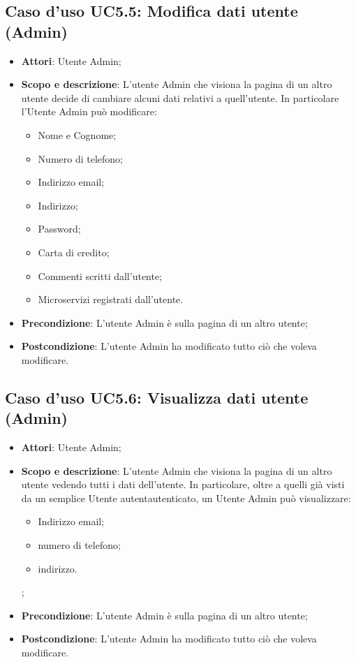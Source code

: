 \documentclass[12pt,a4paper,titlepage]{article}
\begin{document}
	\subsection{Caso d'uso UC5.5: Modifica dati utente (Admin)}
	\label{UC5.5}
	\begin{itemize}
		\item \textbf{Attori}: Utente Admin;
		\item \textbf{Scopo e descrizione}: L'utente Admin che visiona la pagina di un altro utente decide di cambiare alcuni dati relativi a quell'utente. In particolare l'Utente Admin può modificare:
		\begin{itemize}
			\item Nome e Cognome;
			\item Numero di telefono;
			\item Indirizzo email;
			\item Indirizzo;
			\item Password;
			\item Carta di credito;
			\item Commenti scritti dall'utente;
			\item Microservizi registrati dall'utente.
		\end{itemize}
		\item \textbf{Precondizione}: L'utente Admin è sulla pagina di un altro utente;
		\item \textbf{Postcondizione}: L'utente Admin ha modificato tutto ciò che voleva modificare.
	\end{itemize}

	\subsection{Caso d'uso UC5.6: Visualizza dati utente (Admin)}
	\label{UC5.6}
	\begin{itemize}
		\item \textbf{Attori}: Utente Admin;
		\item \textbf{Scopo e descrizione}: L'utente Admin che visiona la pagina di un altro utente vedendo tutti i dati dell'utente. In particolare, oltre a quelli già visti da un semplice Utente autentautenticato, un Utente Admin può visualizzare:
		\begin{itemize}
			\item Indirizzo email;
			\item numero di telefono;
			\item indirizzo.
		\end{itemize};
		\item \textbf{Precondizione}: L'utente Admin è sulla pagina di un altro utente;
		\item \textbf{Postcondizione}: L'utente Admin ha modificato tutto ciò che voleva modificare.
	\end{itemize}
\end{document}
